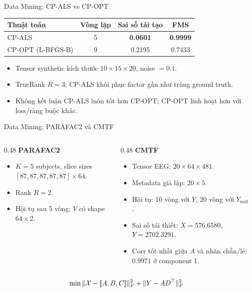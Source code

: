 \begin{frame}{Data Mining: CP-ALS vs CP-OPT}
\centering
\renewcommand{\arraystretch}{1.25}
\begin{tabular}{lccc}
\toprule
\textbf{Thuật toán} & \textbf{Vòng lặp} & \textbf{Sai số tái tạo} & \textbf{FMS} \\
\midrule
CP-ALS & 5 & \textbf{0.0601} & \textbf{0.9999} \\
CP-OPT (L-BFGS-B) & 9 & 0.2195 & 0.7433 \\
\bottomrule
\end{tabular}

\vspace{0.35cm}
\begin{itemize}
    \item Tensor synthetic kích thước $10\times15\times20$, noise $=0.1$.
    \item TrueRank $R=3$; CP-ALS khôi phục factor gần như trùng ground truth.
    \item Không kết luận CP-ALS luôn tốt hơn CP-OPT; CP-OPT linh hoạt hơn với loss/ràng buộc khác.
\end{itemize}
\end{frame}

\begin{frame}{Data Mining: PARAFAC2 và CMTF}
\begin{columns}[T,totalwidth=\textwidth]
    \begin{column}{0.48\textwidth}
        \textbf{PARAFAC2}
        \begin{itemize}
            \item $K=5$ subjects, slice sizes $[87,87,87,87,87]\times64$.
            \item Rank $R=2$.
            \item Hội tụ sau 5 vòng; $V$ có shape $64\times2$.
        \end{itemize}
    \end{column}
    \begin{column}{0.48\textwidth}
        \textbf{CMTF}
        \begin{itemize}
            \item Tensor EEG: $20\times64\times481$.
            \item Metadata giả lập: $20\times5$.
            \item Hội tụ: 10 vòng với $Y$, 20 vòng với $Y_{\text{null}}$.
            \item Sai số tái thiết: $X=576.6580$, $Y=2702.3291$.
            \item Corr tốt nhất giữa $A$ và nhãn chẵn/lẻ: $0.9971$ ở component 1.
        \end{itemize}
    \end{column}
\end{columns}
\[
    \min \|\mathcal{X}-[\![A,B,C]\!]\|_F^2+\|Y-AD^\top\|_F^2
\]
\end{frame}

